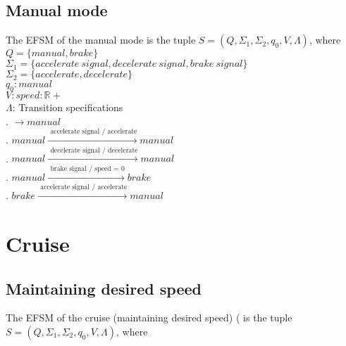 \documentclass[12pt]{article}
\begin{document}
\begin{spacing}{1.5}
\newpage

\subsection{Manual mode}

\noindent The EFSM of the manual mode is the tuple $S = (Q, \Sigma_1, \Sigma_2, q_0, V, \Lambda)$, where\\

\noindent $Q = \{manual, brake\}$\\
\noindent $\Sigma_1 = \{accelerate~signal, decelerate~signal, brake~signal\}$\\
\noindent $\Sigma_2 = \{accelerate, decelerate\}$\\
\noindent $q_0: manual$\\
\noindent $V: speed: \mathbb{R+} $\\
\noindent $\Lambda$: Transition specifications\\
. $\rightarrow manual$\\
. $manual \xrightarrow {\text { accelerate signal / accelerate}} manual$\\
. $manual \xrightarrow {\text { decelerate signal / decelerate}} manual$\\
. $manual \xrightarrow {\text { brake signal / speed = 0}} brake$\\
. $brake \xrightarrow {\text { accelerate signal / accelerate}} manual$\\

\section{Cruise}
\subsection{Maintaining desired speed}

\noindent The EFSM of the cruise (maintaining desired speed) ( is the tuple $S = (Q, \Sigma_1, \Sigma_2, q_0, V, \Lambda)$, where\\


\end{spacing}
\end{document}
